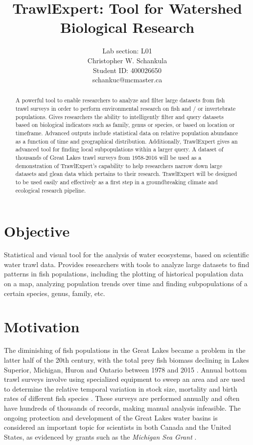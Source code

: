\documentclass{article}
\begin{document}
\title{TrawlExpert: Tool for Watershed Biological Research}
\author{Lab section: L01 \\ Christopher W. Schankula \\Student ID: 400026650 \\schankuc@mcmaster.ca}

\maketitle

\begin{abstract}
\noindent A powerful tool to enable researchers to analyze and filter large datasets from fish trawl surveys in order to perform environmental research on fish and / or invertebrate populations. Gives researchers the ability to intelligently filter and query datasets based on biological indicators such as family, genus or species, or based on location or timeframe. Advanced outputs include statistical data on relative population abundance as a function of time and geographical distribution. Additionally, TrawlExpert gives an advanced tool for finding local subpopulations within a larger query. A dataset of thousands of Great Lakes trawl surveys from 1958-2016 will be used as a demonstration of TrawlExpert's capability to help researchers narrow down large datasets and glean data which pertains to their research. TrawlExpert will be designed to be used easily and effectively as a first step in a groundbreaking climate and ecological research pipeline.

\end{abstract}

\section{Objective}
Statistical and visual tool for the analysis of water ecosystems, based on scientific water trawl data. Provides researchers with tools to analyze large datasets to find patterns in fish populations, including the plotting of historical population data on a map, analyzing population trends over time and finding subpopulations of a certain species, genus, family, etc.

\section{Motivation}
The diminishing of fish populations in the Great Lakes became a problem in the latter half of the 20th century, with the total prey fish biomass declining in Lakes Superior, Michigan, Huron and Ontario between 1978 and 2015 \citep{michigan2017}. Annual bottom trawl surveys involve using specialized equipment to sweep an area and are used to determine the relative temporal variation in stock size, mortality and birth rates of different fish species \citep{walsh1997efficiency}. These surveys are performed annually and often have hundreds of thousands of records, making manual analysis infeasible. The ongoing protection and development of the Great Lakes water basins is considered an important topic for scientists in both Canada and the United States, as evidenced by grants such as the \textit{Michigan Sea Grant} \citep{michseagr2018}.
\end{document}
